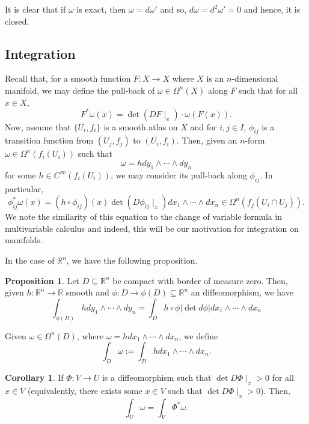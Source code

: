 \documentclass[]{article}
\theoremstyle{definition}
\newtheorem{corollary}{Corollary}[theorem]
\theoremstyle{definition}
\newtheorem{proposition}{Proposition}[section]
\begin{document}
It is clear that if \(\omega\) is exact, then \(\omega = d\omega'\) and so, 
\(d\omega = d^2 \omega' = 0\) and hence, it is closed.

\subsection{Integration}

Recall that, for a smooth function \(F : X \to X\) where \(X\) is an \(n\)-dimensional 
manifold, we may define the pull-back of \(\omega \in \Omega^n(X)\) along \(F\) 
such that for all \(x \in X\),
\[F^* \omega(x) = \det(DF\mid_x) \cdot \omega(F(x)).\]
Now, assume that \(\{U_i, f_i\}\) is a smooth atlas on \(X\) and for \(i, j \in I\), 
\(\phi_{ij}\) is a transition function from \((U_j, f_j)\) to \((U_i, f_i)\). 
Then, given an \(n\)-form \(\omega \in \Omega^n(f_i(U_i))\) such that 
\[\omega = hdy_1 \wedge \cdots \wedge dy_n\]
for some \(h \in C^\infty(f_i(U_i))\), we may consider its pull-back along 
\(\phi_{ij}\). In particular, 
\[\phi^*_{ij} \omega(x) = (h \circ \phi_{ij})(x)\det(D \phi_{ij}\mid_x) 
  dx_1 \wedge \cdots \wedge dx_n \in \Omega^n(f_j(U_i \cap U_j)).\]
We note the similarity of this equation to the change of variable formula 
in multivariable calculus and indeed, this will be our motivation for integration 
on manifolds.

In the case of \(\mathbb{R}^n\), we have the following proposition.

\begin{proposition}
  Let \(D \subseteq \mathbb{R}^n\) be compact with border of measure zero. 
  Then, given \(h : \mathbb{R}^n \to \mathbb{R}\) smooth and 
  \(\phi : D \to \phi(D) \subseteq \mathbb{R}^n\) an diffeomorphism, we have 
  \[\int_{\phi(D)} hdy_1 \wedge \cdots \wedge dy_n = 
    \int_D h \circ \phi |\det d\phi| dx_1 \wedge \cdots \wedge dx_n\]
\end{proposition}

Given \(\omega \in \Omega^n(D)\), where \(\omega = h dx_1 \wedge \cdots \wedge dx_n\), 
we define 
\[\int_D \omega := \int_D h dx_1 \wedge \cdots \wedge dx_n.\]

\begin{corollary}\label{change-of-var}
  If \(\Phi : V \to U\) is a diffeomorphism such that \(\det D\Phi\mid_x > 0\) 
  for all \(x \in V\) (equivalently, there exists some \(x \in V\) such that 
  \(\det D\Phi\mid_x > 0\)). Then, 
  \[\int_U \omega = \int_V \Phi^* \omega.\] 
\end{corollary}
\end{document}
